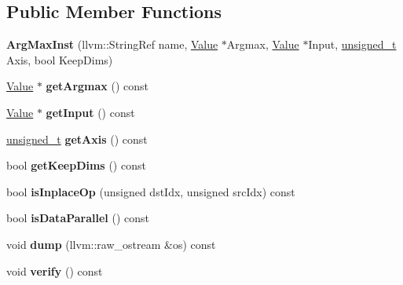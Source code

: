 \subsection*{Public Member Functions}
\begin{DoxyCompactItemize}
\item 
\mbox{\label{classglow_1_1_arg_max_inst_ab1e48010ec0a87e5ef03ca2f6ff4c975}} 
{\bfseries Arg\+Max\+Inst} (llvm\+::\+String\+Ref name, \hyperlink{classglow_1_1_value}{Value} $\ast$Argmax, \hyperlink{classglow_1_1_value}{Value} $\ast$Input, \hyperlink{namespaceglow_a0ca574644e1e42ef193a9947fb4d8911}{unsigned\+\_\+t} Axis, bool Keep\+Dims)
\item 
\mbox{\label{classglow_1_1_arg_max_inst_ae41028bef5e760b62fb1a3bb6704c809}} 
\hyperlink{classglow_1_1_value}{Value} $\ast$ {\bfseries get\+Argmax} () const
\item 
\mbox{\label{classglow_1_1_arg_max_inst_a23ae42a64dc39a68f10f82002dcbede5}} 
\hyperlink{classglow_1_1_value}{Value} $\ast$ {\bfseries get\+Input} () const
\item 
\mbox{\label{classglow_1_1_arg_max_inst_a3c506e1e3c054d8332f1a7278c591848}} 
\hyperlink{namespaceglow_a0ca574644e1e42ef193a9947fb4d8911}{unsigned\+\_\+t} {\bfseries get\+Axis} () const
\item 
\mbox{\label{classglow_1_1_arg_max_inst_afd1af94502db46c301f26d199c0ffb6e}} 
bool {\bfseries get\+Keep\+Dims} () const
\item 
\mbox{\label{classglow_1_1_arg_max_inst_a62fa65159a216a71299550aa6bb38fa0}} 
bool {\bfseries is\+Inplace\+Op} (unsigned dst\+Idx, unsigned src\+Idx) const
\item 
\mbox{\label{classglow_1_1_arg_max_inst_a6d89fba3d43c8d98414ec3553d14f8aa}} 
bool {\bfseries is\+Data\+Parallel} () const
\item 
\mbox{\label{classglow_1_1_arg_max_inst_a5c11e3edbeabca67d35192a62e9184f6}} 
void {\bfseries dump} (llvm\+::raw\+\_\+ostream \&os) const
\item 
\mbox{\label{classglow_1_1_arg_max_inst_ad967dd56dfcdbc7b158bf730c8d91b94}} 
void {\bfseries verify} () const
\end{DoxyCompactItemize}
